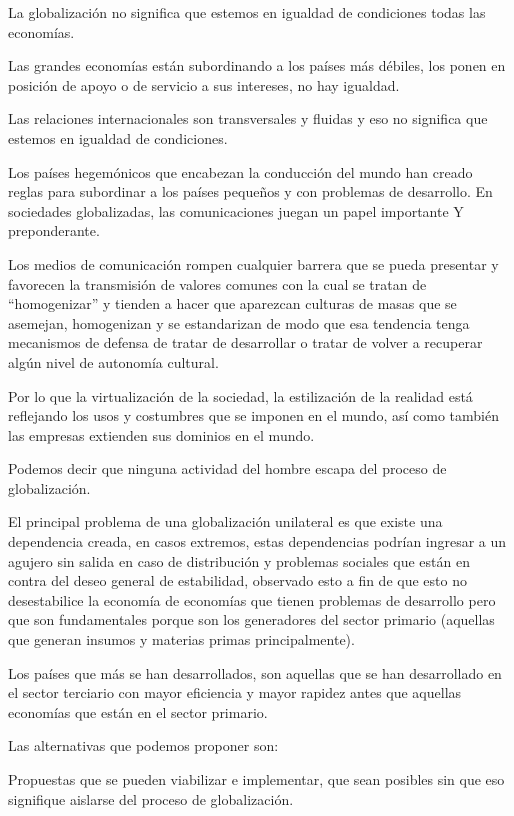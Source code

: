 \documentclass[
  a4paper,
]{article}
\begin{document}
La globalización no significa que estemos en igualdad de condiciones
todas las economías.

Las grandes economías están subordinando a los países más débiles, los
ponen en posición de apoyo o de servicio a sus intereses, no hay
igualdad.

Las relaciones internacionales son transversales y fluidas y eso no
significa que estemos en igualdad de condiciones.

Los países hegemónicos que encabezan la conducción del mundo han creado
reglas para subordinar a los países pequeños y con problemas de
desarrollo. En sociedades globalizadas, las comunicaciones juegan un
papel importante Y preponderante.

Los medios de comunicación rompen cualquier barrera que se pueda
presentar y favorecen la transmisión de valores comunes con la cual se
tratan de ``homogenizar'' y tienden a hacer que aparezcan culturas de
masas que se asemejan, homogenizan y se estandarizan de modo que esa
tendencia tenga mecanismos de defensa de tratar de desarrollar o tratar
de volver a recuperar algún nivel de autonomía cultural.

Por lo que la virtualización de la sociedad, la estilización de la
realidad está reflejando los usos y costumbres que se imponen en el
mundo, así como también las empresas extienden sus dominios en el mundo.

Podemos decir que ninguna actividad del hombre escapa del proceso de
globalización.

El principal problema de una globalización unilateral es que existe una
dependencia creada, en casos extremos, estas dependencias podrían
ingresar a un agujero sin salida en caso de distribución y problemas
sociales que están en contra del deseo general de estabilidad, observado
esto a fin de que esto no desestabilice la economía de economías que
tienen problemas de desarrollo pero que son fundamentales porque son los
generadores del sector primario (aquellas que generan insumos y materias
primas principalmente).

Los países que más se han desarrollados, son aquellas que se han
desarrollado en el sector terciario con mayor eficiencia y mayor rapidez
antes que aquellas economías que están en el sector primario.

Las alternativas que podemos proponer son:

Propuestas que se pueden viabilizar e implementar, que sean posibles sin
que eso signifique aislarse del proceso de globalización.
\end{document}
